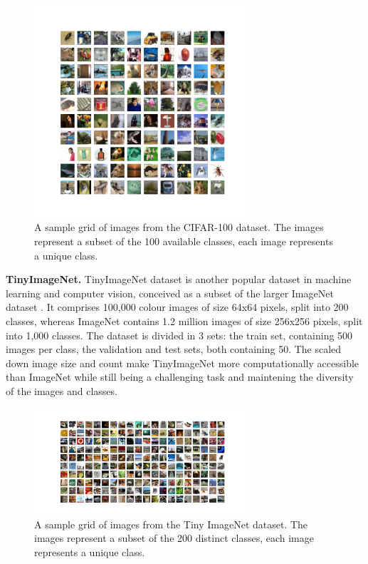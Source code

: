 \begin{figure}[ht!]
    \centering
    \includegraphics[width=0.7\textwidth]{chapter_intro/assets/cifar-100_example.png}
    \caption{A sample grid of images from the CIFAR-100 dataset. The images
    represent a subset of the 100 available classes, each image represents
    a unique class.}
    \label{fig:intro:cifar100_examples}
\end{figure}

\noindent\textbf{TinyImageNet.} TinyImageNet dataset is another popular dataset
in machine learning and computer vision, conceived as a subset of the larger
ImageNet dataset \cite{DBLP:journals/ijcv/RussakovskyDSKS15}. It comprises
100,000 colour images of size 64x64 pixels, split into 200 classes, whereas
ImageNet contains 1.2 million images of size 256x256 pixels, split into 1,000
classes. The dataset is divided in 3 sets: the train set, containing 500
images per class, the validation and test sets, both containing 50. The scaled
down image size and count make TinyImageNet more computationally accessible than
ImageNet while still being a challenging task and maintening the diversity of
the images and classes.\\


\begin{figure}[ht!]
    \centering
    \includegraphics[width=0.7\textwidth]{chapter_intro/assets/tinyimagenet_example.png}
    \caption{A sample grid of images from the Tiny ImageNet dataset. The images
    represent a subset of the 200 distinct classes, each image represents a
    unique class.}
    \label{fig:intro:tinyimagenet_examples}
\end{figure}

